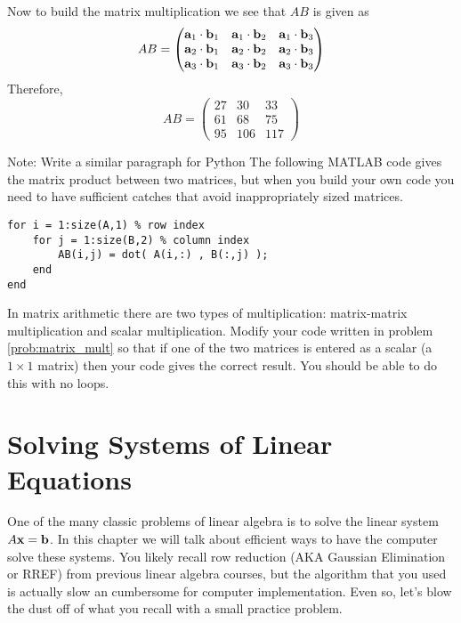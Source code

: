 \begin{example}
    Now to build the matrix multiplication we see that $AB$ is given as
    \[ AB = \begin{pmatrix} 
            {\bf a}_1 \cdot {\bf b}_1 & {\bf a}_1 \cdot {\bf b}_2 & {\bf a}_1 \cdot {\bf b}_3 \\
            {\bf a}_2 \cdot {\bf b}_1 & {\bf a}_2 \cdot {\bf b}_2 & {\bf a}_2 \cdot {\bf b}_3 \\
            {\bf a}_3 \cdot {\bf b}_1 & {\bf a}_3 \cdot {\bf b}_2 & {\bf a}_3 \cdot {\bf b}_3
    \end{pmatrix} \]
    Therefore,
    \[ AB = \begin{pmatrix} 27 & 30 & 33 \\
            61 & 68 & 75 \\
        95 & 106 & 117 \end{pmatrix} \]
\end{example}

\ifnum{} {\color{red} Note: Write a similar paragraph for Python} \fi
The following MATLAB code gives the matrix product between two matrices, but when you
build your own code you need to have sufficient catches that avoid inappropriately sized
matrices.
\begin{lstlisting}
for i = 1:size(A,1) % row index
    for j = 1:size(B,2) % column index
        AB(i,j) = dot( A(i,:) , B(:,j) );
    end
end
\end{lstlisting}

\begin{problem}
    In matrix arithmetic there are two types of multiplication: matrix-matrix
    multiplication and scalar multiplication.  Modify your code written in problem
    \ref{prob:matrix_mult} so that if one of the two matrices is entered as a scalar (a $1
    \times 1$ matrix) then your  code gives the correct result. You
    should be able to do this with no loops.
\end{problem}


\newpage\section{Solving Systems of Linear Equations}
One of the many classic problems of linear algebra is to solve the linear system $A {\bf x} =
{\bf b}$. In this chapter we will talk about efficient ways to have the computer solve
these systems. You likely recall row reduction (AKA Gaussian Elimination or RREF) from previous linear algebra
courses, but the algorithm that you used is actually slow an cumbersome for computer
implementation.  Even so, let's blow the dust off of what you recall with a small practice
problem.

